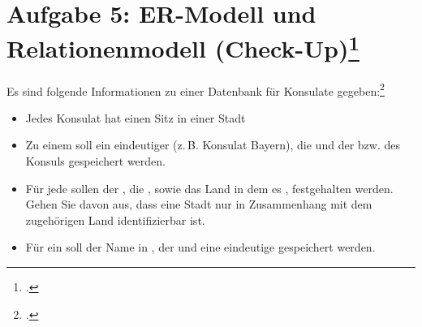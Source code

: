 \documentclass{lehramt-informatik-minimal}
\begin{document}
\section{Aufgabe 5: ER-Modell und Relationenmodell
(Check-Up)\footcite{db:ab:2}}

Es sind folgende Informationen zu einer Datenbank für Konsulate
gegeben:\footcite[Staatsexamen Softwaretechnologie/Datenbanksysteme,
Thema Nr. 1, Teilaufgabe II, Aufgabe 3, Frühjahr 2015
Realschule]{examen:46116:2015:03}

\begin{itemize}

\item Jedes Konsulat hat einen Sitz in einer Stadt

\item Zu einem  soll ein eindeutiger
  (z.\,B. Konsulat Bayern), die
 und der   bzw.
  des Konsuls gespeichert werden.

\item Für jede  sollen der 
, die 
, sowie das Land in dem es ,
festgehalten werden. Gehen Sie davon aus, dass eine Stadt nur in
Zusammenhang mit dem zugehörigen Land identifizierbar ist.

\item Für ein  soll der Name in
, der   und eine eindeutige
  gespeichert werden.
\end{itemize}
\end{document}

